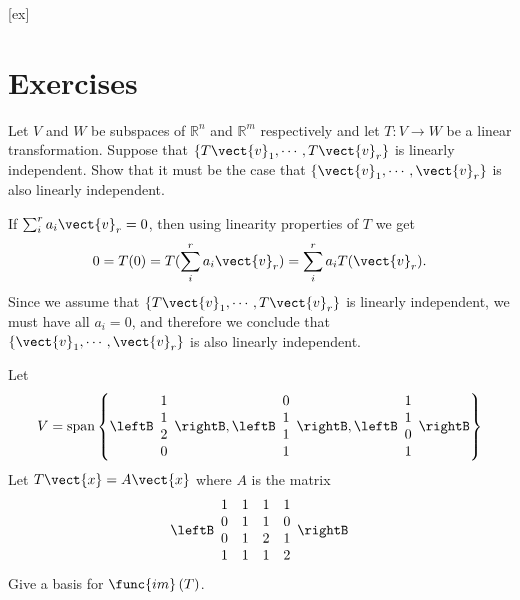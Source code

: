 [ex]
\section*{Exercises}

\begin{enumialphparenastyle}

\begin{ex} Let $V$ and $W$ be subspaces of $\mathbb{R}^{n}$ and $\mathbb{R}^{m}$
respectively and let $T:V\rightarrow W$ be a linear transformation. Suppose
that $\left\{ T\vect{v}_{1},\cdots ,T\vect{v}_{r}\right\} $ is linearly
independent. Show that it must be the case that $\left\{ \vect{v}_{1},\cdots ,
\vect{v}_{r}\right\} $ is also linearly independent.
\begin{sol}
If $\sum_i^r a_i \vect{v}_r =0$, then using linearity properties of $T$ we get 
\[ 0 = T(0) =  T(\sum_i^r a_i \vect{v}_r) = 
\sum_i^r a_i T(\vect{v}_r).\]
Since we assume that  $\left\{ T\vect{v}_{1},\cdots ,T\vect{v}_{r}\right\} $ is linearly
independent, we must have all $a_i=0$, and therefore we conclude that 
 $\left\{ \vect{v}_{1},\cdots ,
\vect{v}_{r}\right\} $ is also linearly independent.
\end{sol}
\end{ex}


\begin{ex} Let 
\begin{equation*}
V=\mbox{span}\left\{ \leftB 
\begin{array}{c}
1 \\ 
1 \\ 
2 \\ 
0
\end{array}
\rightB ,\leftB 
\begin{array}{c}
0 \\ 
1 \\ 
1 \\ 
1
\end{array}
\rightB ,\leftB 
\begin{array}{c}
1 \\ 
1 \\ 
0 \\ 
1
\end{array}
\rightB \right\}
\end{equation*}
Let $T\vect{x}=A\vect{x}$ where $A$ is the matrix 
\begin{equation*}
\leftB 
\begin{array}{cccc}
1 & 1 & 1 & 1 \\ 
0 & 1 & 1 & 0 \\ 
0 & 1 & 2 & 1 \\ 
1 & 1 & 1 & 2
\end{array}
\rightB
\end{equation*}
Give a basis for $\func{im}\left( T\right) $.
\end{ex}



\end{enumialphparenastyle}
